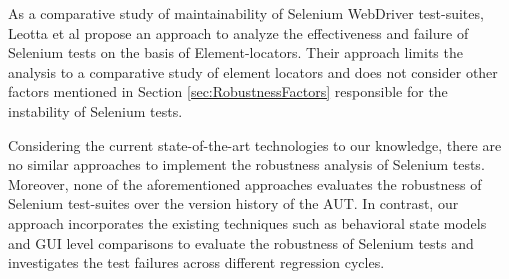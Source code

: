 As a comparative study of maintainability of Selenium WebDriver test-suites, Leotta et al \cite{leotta2013comparing} propose an approach to analyze the effectiveness and failure of Selenium tests on the basis of Element-locators. Their approach limits the analysis to a comparative study of element locators and does not consider other factors mentioned in Section \ref{sec:RobustnessFactors} responsible for the instability of Selenium tests. 

Considering the current state-of-the-art technologies to our knowledge, there are no similar approaches to implement the robustness analysis of Selenium tests. Moreover, none of the aforementioned approaches evaluates the robustness of Selenium test-suites over the version history of the AUT. In contrast, our approach incorporates the existing techniques such as behavioral state models and GUI level comparisons to evaluate the robustness of Selenium tests and investigates the test failures across different regression cycles.